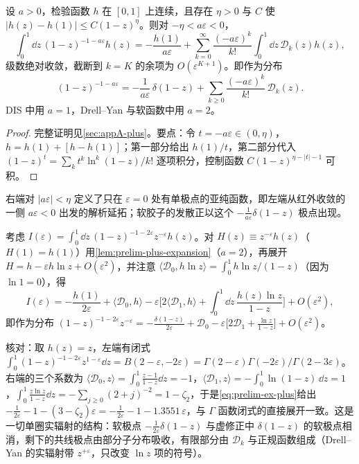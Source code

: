 \begin{lemma}\label{lem:prelim-plus-expansion}
设 $a>0$，检验函数 $h$ 在 $[0,1]$ 上连续，且存在 $\eta>0$ 与 $C$ 使 $|h(z)-h(1)|\le C(1-z)^\eta$。则对 $-\eta<a\varepsilon<0$，
\begin{equation}\label{eq:prelim-plus-expansion}
\int_0^1\dd z\,(1-z)^{-1-a\varepsilon}h(z)=-\frac{h(1)}{a\varepsilon}+\sum_{k=0}^\infty\frac{(-a\varepsilon)^k}{k!}\int_0^1\dd z\,\mathcal D_k(z)h(z),
\end{equation}
级数绝对收敛，截断到 $k=K$ 的余项为 $O(\varepsilon^{K+1})$。即作为分布
\[
(1-z)^{-1-a\varepsilon}=-\frac1{a\varepsilon}\,\delta(1-z)+\sum_{k\ge0}\frac{(-a\varepsilon)^k}{k!}\,\mathcal D_k(z).
\]
DIS 中用 $a=1$，Drell--Yan 与软函数中用 $a=2$。
\end{lemma}

\begin{proof}
完整证明见\cref{sec:appA-plus}。要点：令 $t=-a\varepsilon\in(0,\eta)$，$h=h(1)+[h-h(1)]$；第一部分给出 $h(1)/t$，第二部分代入 $(1-z)^{t}=\sum_kt^k\ln^k(1-z)/k!$ 逐项积分，控制函数 $C(1-z)^{\eta-|t|-1}$ 可积。
\end{proof}

右端对 $|a\varepsilon|<\eta$ 定义了只在 $\varepsilon=0$ 处有单极点的亚纯函数，即左端从红外收敛的一侧 $a\varepsilon<0$ 出发的解析延拓；软胶子的发散正以这个 $-\frac1{a\varepsilon}\delta(1-z)$ 极点出现。

\begin{example}[单圈实辐射的典型积分]\label{ex:prelim-plus}
考虑 $I(\varepsilon)=\int_0^1\dd z\,(1-z)^{-1-2\varepsilon}z^{-\varepsilon}h(z)$。对 $H(z)\equiv z^{-\varepsilon}h(z)$（$H(1)=h(1)$）用\cref{lem:prelim-plus-expansion}（$a=2$），再展开 $H=h-\varepsilon h\ln z+O(\varepsilon^2)$，并注意 $\langle\mathcal D_0,h\ln z\rangle=\int_0^1h\ln z/(1-z)$（因为 $\ln1=0$），得
\begin{equation}\label{eq:prelim-ex-plus}
I(\varepsilon)=-\frac{h(1)}{2\varepsilon}+\langle\mathcal D_0,h\rangle-\varepsilon\Big[2\langle\mathcal D_1,h\rangle+\int_0^1\dd z\,\frac{h(z)\ln z}{1-z}\Big]+O(\varepsilon^2),
\end{equation}
即作为分布 $(1-z)^{-1-2\varepsilon}z^{-\varepsilon}=-\frac{\delta(1-z)}{2\varepsilon}+\mathcal D_0-\varepsilon\big[2\mathcal D_1+\frac{\ln z}{1-z}\big]+O(\varepsilon^2)$。

核对：取 $h(z)=z$，左端有闭式 $\int_0^1(1-z)^{-1-2\varepsilon}z^{1-\varepsilon}\dd z=B(2-\varepsilon,-2\varepsilon)=\Gamma(2-\varepsilon)\Gamma(-2\varepsilon)/\Gamma(2-3\varepsilon)$。右端的三个系数为 $\langle\mathcal D_0,z\rangle=\int_0^1\frac{z-1}{1-z}\dd z=-1$，$\langle\mathcal D_1,z\rangle=-\int_0^1\ln(1-z)\,\dd z=1$，$\int_0^1\frac{z\ln z}{1-z}\dd z=-\sum_{j\ge0}(2+j)^{-2}=1-\zeta_2$，于是\cref{eq:prelim-ex-plus}给出 $-\frac1{2\varepsilon}-1-(3-\zeta_2)\varepsilon=-\frac1{2\varepsilon}-1-1.3551\,\varepsilon$，与 $\Gamma$ 函数闭式的直接展开一致。这是一切单圈实辐射的结构：软极点 $-\frac{1}{2\varepsilon}\delta(1-z)$ 与虚修正中 $\delta(1-z)$ 的软极点相消，剩下的共线极点由部分子分布吸收，有限部分由 $\mathcal D_k$ 与正规函数组成（Drell--Yan 的实辐射带 $z^{+\varepsilon}$，只改变 $\ln z$ 项的符号）。
\end{example}

